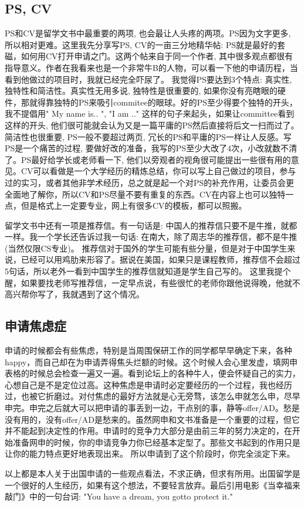 \subsection{PS, CV}

PS和CV是留学文书中最重要的两项, 也会最让人头疼的两项。PS因为文字更多, 所以相对更难。这里我先分享写PS, CV的一亩三分地精华帖: PS就是最好的套磁，如何用CV打开申请之门。这两个帖来自于同一个作者, 其中很多观点都很有指导意义。作者在我看来也是一个非常牛B的人物，可以看一下他的申请历程，当看到他做过的项目时，我就已经完全吓尿了。 我觉得PS要达到3个特点: 真实性, 独特性和简洁性。真实性无用多说, 独特性是很重要的, 如果你没有亮瞎眼的硬件，那就得靠独特的PS来吸引commitee的眼球。好的PS至少得要个独特的开头，我不提倡用" My name is.. ", "I am .." 这样的句子来起头，如果让committee看到这样的开头, 他们很可能就会认为又是一篇平庸的PS然后直接将后文一扫而过了。简洁性也很重要, PS一般不要超过两页, 冗长的PS和平庸的PS一样让人反感。写PS是一个痛苦的过程, 要做好改的准备，我写的PS至少大改了4次，小改就数不清了。PS最好给学长或老师看一下, 他们以旁观者的视角很可能提出一些很有用的意见。CV可以看做是一个大学经历的精炼总结，你可以写上自己做过的项目，参与过的实习，或者其他非学术经历，总之就是起一个对PS的补充作用，让委员会更全面地了解你，所以CV和PS尽量不要有重复的东西。CV在内容上也可以独特一点，但是格式上一定要专业，网上有很多CV的模板，都可以照搬。\par

留学文书中还有一项是推荐信。有一句话是: 中国人的推荐信只要不是牛推，就都一样。我一个学长还告诉过我一句话: 在南大，除了周志华的推荐信，都不是牛推(当然仅限CS专业)。 推荐信对于国外的学生可能有些分量，但是对于中国学生来说，已经可以用鸡肋来形容了。据说在美国，如果只是课程教师，推荐信不会超过5句话，所以老外一看到中国学生的推荐信就知道是学生自己写的。 这里我提个醒，如果要找老师写推荐信，一定早点说，有些很忙的老师你跟他说得晚，他就不高兴帮你写了，我就遇到了这个情况。\par

\subsection{申请焦虑症}

申请的时候都会有些焦虑，特别是当周围保研工作的同学都早早确定下来，各种happy，而自己却在为申请弄得焦头烂额的时候。这个时候人会心里发虚，填网申表格的时候总会检查一遍又一遍。看到论坛上的各种牛人，便会怀疑自己的实力，心想自己是不是定位过高。这种焦虑是申请时必定要经历的一个过程，我也经历过，也被它折磨过。对付焦虑的最好方法就是心无旁骛，该怎么申就怎么申，尽早申完。申完之后就大可以把申请的事丢到一边，干点别的事，静等offer/AD。愁是没有用的，没有offer/AD是愁来的。虽然网申和文书准备是一个重要的过程，但它并不能起到决定性的作用。申请时的竞争力大部分是由前三年的努力决定的，在开始准备网申的时候，你的申请竞争力你已经基本定型了。那些文书起到的作用只是让你的能力特点更好地表现出来。 所以申请到了这个阶段时，你完全淡定下来。\par

 以上都是本人关于出国申请的一些观点看法，不求正确，但求有所用。出国留学是一个很好的人生经历，如果有这个想法，不要轻言放弃。最后引用电影《当幸福来敲门》中的一句台词: "You have a dream, you gotto protect it."    